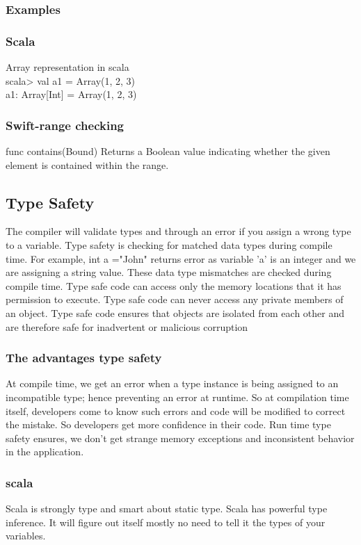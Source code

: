 \documentclass{sig-alternate}
\begin{document}
	\subsubsection{Examples}
	\subsubsection{Scala}
	Array representation in scala \\
	scala> val a1 = Array(1, 2, 3) \\
	a1: Array[Int] = Array(1, 2, 3)
	\subsubsection{Swift-range checking }
	func contains(Bound)
	Returns a Boolean value indicating whether the given element is contained within the range.
	
	
	\subsection{Type Safety}
	The compiler will validate types and through an error if you assign a wrong type to a variable. 
	Type safety is checking for matched data types during compile time. For example, int a ="John" returns error as variable 'a' is an integer and we are assigning a string value. These data type mismatches are checked during compile time. Type safe code can access only the memory locations that it has permission to execute. Type safe code can never access any private members of an object. Type safe code ensures that objects are isolated from each other and are therefore safe for inadvertent or malicious corruption
	\subsubsection{The advantages type safety }
	At compile time, we get an error when a type instance is being assigned to an incompatible type; hence preventing an error at runtime. So at compilation time itself, developers come to know such errors and code will be modified to correct the mistake. So developers get more confidence in their code.
	Run time type safety ensures, we don't get strange memory exceptions and inconsistent behavior in the application.
	
	\subsubsection{scala}
	Scala is strongly type and smart about static type. Scala has powerful type inference. It will figure out itself mostly no need to tell it the types of your variables. 
\end{document}
